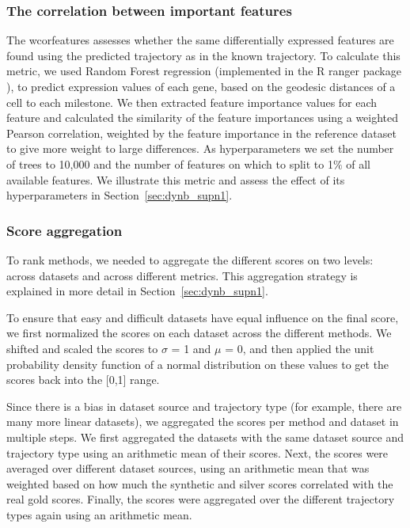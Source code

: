\subsubsection{The correlation between important features}

The wcorfeatures assesses whether the same differentially expressed features are found using the predicted trajectory as in the known trajectory. To calculate this metric, we used Random Forest regression (implemented in the R ranger package \cite{wright_rangerfastimplementation_2017}), to predict expression values of each gene, based on the geodesic distances of a cell to each milestone. We then extracted feature importance values for each feature and calculated the similarity of the feature importances using a weighted Pearson correlation, weighted by the feature importance in the reference dataset to give more weight to large differences. As hyperparameters we set the number of trees to 10,000 and the number of features on which to split to 1$\%$ of all available features. We illustrate this metric and assess the effect of its hyperparameters in Section~\ref{sec:dynb_supn1}.

\subsubsection{Score aggregation}

To rank methods, we needed to aggregate the different scores on two levels: across datasets and across different metrics. This aggregation strategy is explained in more detail in Section~\ref{sec:dynb_supn1}.

To ensure that easy and difficult datasets have equal influence on the final score, we first normalized the scores on each dataset across the different methods. We shifted and scaled the scores to $\sigma$ = 1 and $\mu$ = 0, and then applied the unit probability density function of a normal distribution on these values to get the scores back into the [0,1] range.

Since there is a bias in dataset source and trajectory type (for example, there are many more linear datasets), we aggregated the scores per method and dataset in multiple steps. We first aggregated the datasets with the same dataset source and trajectory type using an arithmetic mean of their scores. Next, the scores were averaged over different dataset sources, using an arithmetic mean that was weighted based on how much the synthetic and silver scores correlated with the real gold scores. Finally, the scores were aggregated over the different trajectory types again using an arithmetic mean.

